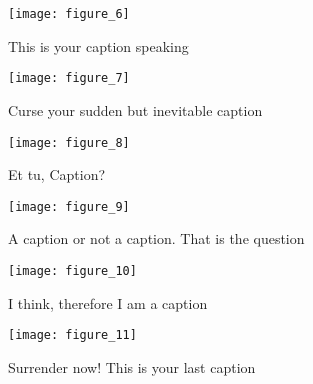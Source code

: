 \documentclass[8pt]{article}
\begin{document}
\begin{figure}
\centering
\texttt{[image: figure\_6]}
\caption{This is your caption speaking}
\label{fig:figure_6Label}
\end{figure}

\begin{figure}
\centering
\texttt{[image: figure\_7]}
\caption{Curse your sudden but inevitable caption}
\label{fig:figure_7Label}
\end{figure}

\begin{figure}
\centering
\texttt{[image: figure\_8]}
\caption{Et tu, Caption?}
\label{fig:figure_8Label}
\end{figure}

\begin{figure}
\centering
\texttt{[image: figure\_9]}
\caption{A caption or not a caption. That is the question}
\label{fig:figure_9Label}
\end{figure}

\begin{figure}
\centering
\texttt{[image: figure\_10]}
\caption{I think, therefore I am a caption}
\label{fig:figure_10Label}
\end{figure}

\begin{figure}
\centering
\texttt{[image: figure\_11]}
\caption{Surrender now! This is your last caption}
\label{fig:figure_11Label}
\end{figure}
\end{document}
